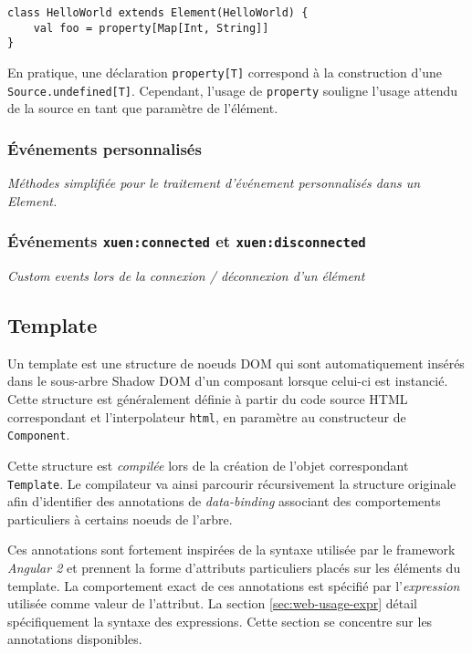\begin{lstlisting}
class HelloWorld extends Element(HelloWorld) {
	val foo = property[Map[Int, String]]
}
\end{lstlisting}

En pratique, une déclaration \texttt{property[T]} correspond à la construction d'une \texttt{Source.undefined[T]}. Cependant, l'usage de \texttt{property} souligne l'usage attendu de la source en tant que paramètre de l'élément.

\subsubsection{Événements personnalisés}

\textit{Méthodes simplifiée pour le traitement d'événement personnalisés dans un Element.}

\subsubsection{Événements \texttt{xuen:connected} et \texttt{xuen:disconnected}}

\textit{Custom events lors de la connexion / déconnexion d'un élément}

\subsection{Template} \label{sec:web-specs-template}

Un template est une structure de noeuds DOM qui sont automatiquement insérés dans le sous-arbre Shadow DOM d'un composant lorsque celui-ci est instancié. Cette structure est généralement définie à partir du code source HTML correspondant et l'interpolateur \texttt{html}, en paramètre au constructeur de \texttt{Component}.

Cette structure est \emph{compilée} lors de la création de l'objet correspondant \texttt{Template}. Le compilateur va ainsi parcourir récursivement la structure originale afin d'identifier des annotations de \emph{data-binding} associant des comportements particuliers à certains noeuds de l'arbre.

Ces annotations sont fortement inspirées de la syntaxe utilisée par le framework \emph{Angular 2} et prennent la forme d'attributs particuliers placés sur les éléments du template. La comportement exact de ces annotations est spécifié par l'\emph{expression} utilisée comme valeur de l'attribut. La section \ref{sec:web-usage-expr} détail spécifiquement la syntaxe des expressions. Cette section se concentre sur les annotations disponibles.

